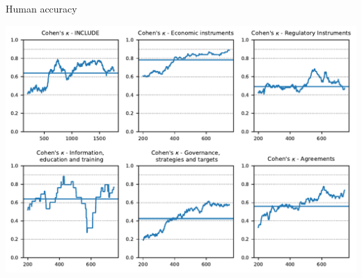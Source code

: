\documentclass[9pt]{beamer}
\begin{document}
\begin{frame}{Human accuracy}

\includegraphics[width=\linewidth]{../figures/agreement_categories.pdf}

\end{frame}
\end{document}
